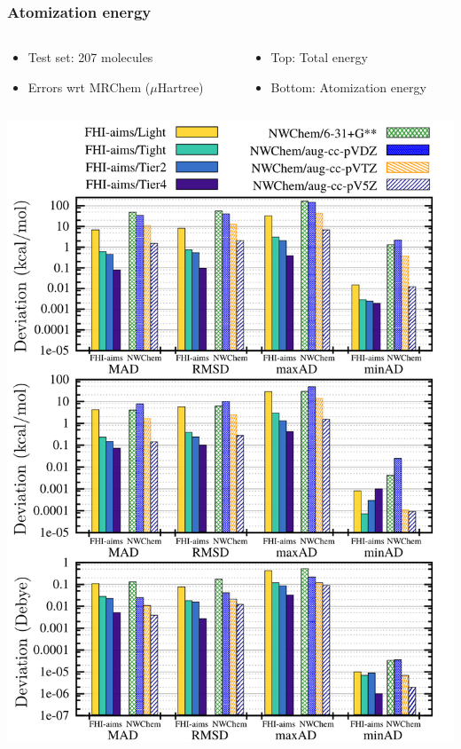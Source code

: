\begin{frame}
    \frametitle{Atomization energy}
    \begin{columns}
    \begin{column}[b]{0.50\linewidth}
        \begin{itemize}
            \item Test set: 207 molecules
            \item Errors wrt MRChem ($\mu$Hartree)
        \end{itemize}
    \end{column}
    \begin{column}[b]{0.50\linewidth}
        \begin{itemize}
            \item Top: Total energy
            \item Bottom: Atomization energy
        \end{itemize}
    \end{column}
    \end{columns}
    \begin{center}
	\includegraphics[scale=0.25, clip, viewport = 0 295 800 1000]{figures/molecule_accuracy.png}
    \end{center}
\end{frame}

